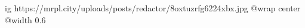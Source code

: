  
 
 
 
 

\ifcmt
  ig https://mrpl.city/uploads/posts/redactor/8oxtuzrfg6224xbx.jpg
  @wrap center
  @width 0.6
\fi
